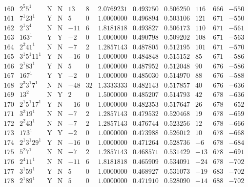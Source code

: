 \documentclass[11pt,reqno,a4letter]{article}
\numberwithin{figure}{section}
\numberwithin{table}{section}
\theoremstyle{plain}
\numberwithin{theorem}{section}
\theoremstyle{definition}
\begin{document}
\begin{table}[ht]
\begin{equation*}
{\begin{array}{cc|cc|ccc|cc|ccc}
 160 & 2^5 5^1 & \text{N} & \text{N} & 13 & 8 & 2.0769231 & 0.493750 & 0.506250 & 116 & 666 & -550 \\
 161 & 7^1 23^1 & \text{Y} & \text{N} & 5 & 0 & 1.0000000 & 0.496894 & 0.503106 & 121 & 671 & -550 \\
 162 & 2^1 3^4 & \text{N} & \text{N} & -11 & 6 & 1.8181818 & 0.493827 & 0.506173 & 110 & 671 & -561 \\
 163 & 163^1 & \text{Y} & \text{Y} & -2 & 0 & 1.0000000 & 0.490798 & 0.509202 & 108 & 671 & -563 \\
 164 & 2^2 41^1 & \text{N} & \text{N} & -7 & 2 & 1.2857143 & 0.487805 & 0.512195 & 101 & 671 & -570 \\
 165 & 3^1 5^1 11^1 & \text{Y} & \text{N} & -16 & 0 & 1.0000000 & 0.484848 & 0.515152 & 85 & 671 & -586 \\
 166 & 2^1 83^1 & \text{Y} & \text{N} & 5 & 0 & 1.0000000 & 0.487952 & 0.512048 & 90 & 676 & -586 \\
 167 & 167^1 & \text{Y} & \text{Y} & -2 & 0 & 1.0000000 & 0.485030 & 0.514970 & 88 & 676 & -588 \\
 168 & 2^3 3^1 7^1 & \text{N} & \text{N} & -48 & 32 & 1.3333333 & 0.482143 & 0.517857 & 40 & 676 & -636 \\
 169 & 13^2 & \text{N} & \text{Y} & 2 & 0 & 1.5000000 & 0.485207 & 0.514793 & 42 & 678 & -636 \\
 170 & 2^1 5^1 17^1 & \text{Y} & \text{N} & -16 & 0 & 1.0000000 & 0.482353 & 0.517647 & 26 & 678 & -652 \\
 171 & 3^2 19^1 & \text{N} & \text{N} & -7 & 2 & 1.2857143 & 0.479532 & 0.520468 & 19 & 678 & -659 \\
 172 & 2^2 43^1 & \text{N} & \text{N} & -7 & 2 & 1.2857143 & 0.476744 & 0.523256 & 12 & 678 & -666 \\
 173 & 173^1 & \text{Y} & \text{Y} & -2 & 0 & 1.0000000 & 0.473988 & 0.526012 & 10 & 678 & -668 \\
 174 & 2^1 3^1 29^1 & \text{Y} & \text{N} & -16 & 0 & 1.0000000 & 0.471264 & 0.528736 & -6 & 678 & -684 \\
 175 & 5^2 7^1 & \text{N} & \text{N} & -7 & 2 & 1.2857143 & 0.468571 & 0.531429 & -13 & 678 & -691 \\
 176 & 2^4 11^1 & \text{N} & \text{N} & -11 & 6 & 1.8181818 & 0.465909 & 0.534091 & -24 & 678 & -702 \\
 177 & 3^1 59^1 & \text{Y} & \text{N} & 5 & 0 & 1.0000000 & 0.468927 & 0.531073 & -19 & 683 & -702 \\
 178 & 2^1 89^1 & \text{Y} & \text{N} & 5 & 0 & 1.0000000 & 0.471910 & 0.528090 & -14 & 688 & -702 \\

\end{array}}
\end{equation*}
\end{table}
\end{document}
